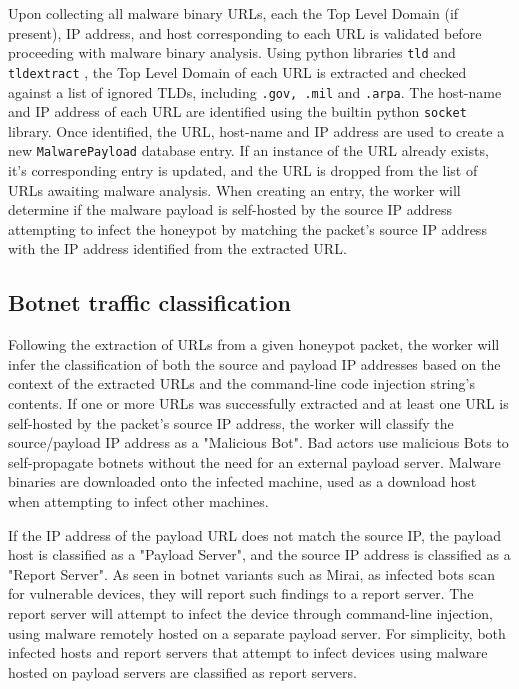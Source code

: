 Upon collecting all malware binary URLs, each the Top Level Domain (if present), IP address, and host corresponding to each URL is validated before proceeding with malware binary analysis. Using python libraries \texttt{tld} and \texttt{tldextract} \citep{TLD, TLDExtract}, the Top Level Domain of each URL is extracted and checked against a list of ignored TLDs, including \texttt{.gov, .mil} and \texttt{.arpa}. The host-name and IP address of each URL are identified using the builtin python \texttt{socket} library. \citep{PythonSocket} Once identified, the URL, host-name and IP address are used to create a new \texttt{MalwarePayload} database entry. If an instance of the URL already exists, it's corresponding entry is updated, and the URL is dropped from the list of URLs awaiting malware analysis. When creating an entry, the worker will determine if the malware payload is self-hosted by the source IP address attempting to infect the honeypot by matching the packet's source IP address with the IP address identified from the extracted URL. 

\subsection{Botnet traffic classification}

Following the extraction of URLs from a given honeypot packet, the worker will infer the classification of both the source and payload IP addresses based on the context of the extracted URLs and the command-line code injection string's contents. If one or more URLs was successfully extracted and at least one URL is self-hosted by the packet's source IP address, the worker will classify the source/payload IP address as a "Malicious Bot". Bad actors use malicious Bots to self-propagate botnets without the need for an external payload server. Malware binaries are downloaded onto the infected machine, used as a download host when attempting to infect other machines.

If the IP address of the payload URL does not match the source IP, the payload host is classified as a "Payload Server", and the source IP address is classified as a "Report Server". As seen in botnet variants such as Mirai, as infected bots scan for vulnerable devices, they will report such findings to a report server. The report server will attempt to infect the device through command-line injection, using malware remotely hosted on a separate payload server. For simplicity, both infected hosts and report servers that attempt to infect devices using malware hosted on payload servers are classified as report servers.

